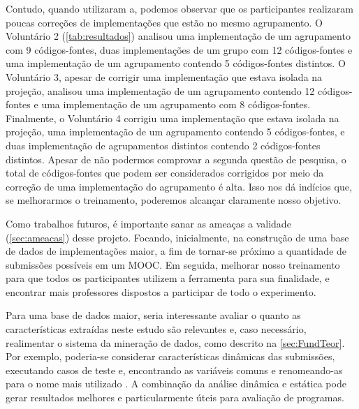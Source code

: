 	Contudo, quando utilizaram a, podemos observar
	que os participantes realizaram poucas correções de implementações que estão no
	mesmo agrupamento. O Voluntário 2 (\cref{tab:resultados}) analisou uma implementação
	de um agrupamento com 9 códigos-fontes, duas implementações de um grupo com 12
	códigos-fontes e uma implementação de um agrupamento contendo 5 códigos-fontes
	distintos. O Voluntário 3, apesar de corrigir uma implementação que estava isolada
	na projeção, analisou uma implementação de um agrupamento contendo 12 códigos-fontes
	e uma implementação de um agrupamento com 8 códigos-fontes. Finalmente, o Voluntário 4
	corrigiu uma implementação que estava isolada na projeção, uma implementação de
	um agrupamento contendo 5 códigos-fontes, e duas implementação de agrupamentos
	distintos contendo 2 códigos-fontes distintos. Apesar de não podermos comprovar
	a segunda questão de pesquisa, o total de códigos-fontes que podem ser considerados
	corrigidos por meio da correção de uma implementação do agrupamento é alta. Isso
	nos dá indícios que, se melhorarmos	o treinamento, poderemos alcançar claramente
	nosso objetivo.
	
	
	Como trabalhos futuros, é importante sanar as ameaças a validade (\cref{sec:ameacas})
	desse projeto. Focando, inicialmente, na construção de uma base de dados de
	implementações maior, a fim de tornar-se próximo a quantidade de submissões
	possíveis em um \acs{MOOC}. Em seguida, melhorar nosso treinamento para que
	todos os participantes utilizem a ferramenta para sua finalidade, e encontrar
	mais professores dispostos a participar de todo o experimento.
	
	Para uma base de dados maior, seria interessante avaliar o quanto as características
	extraídas neste estudo são relevantes e, caso necessário, realimentar o
	sistema da mineração de dados, como descrito na \cref{sec:FundTeor}. Por
	exemplo, poderia-se considerar características dinâmicas das submissões, executando
	casos de teste e, encontrando as variáveis
	comuns e renomeando-as para o nome mais utilizado \cite{Glassman:2015}.
	A combinação da análise dinâmica e estática pode gerar resultados melhores e
	particularmente úteis para avaliação de programas.
